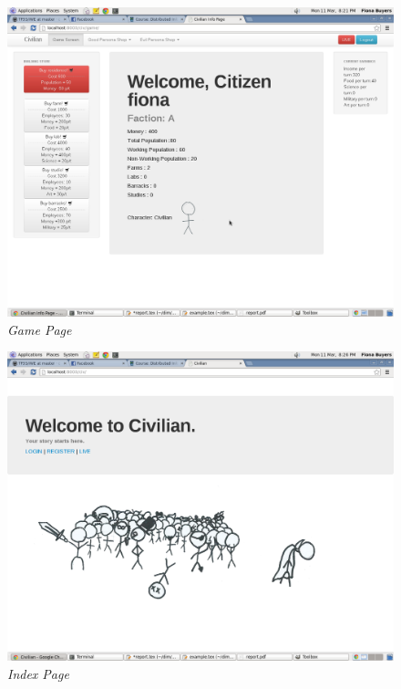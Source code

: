 \documentclass{sig-alt-release2}
\begin{document}
\begin{figure}[!htbp]
  \caption{\textit{Game Page}}
  \begin{center}
		\includegraphics[scale=0.15]{img/gamescreen.png}
  \end{center}
\end{figure}

\begin{figure}[!htbp]
  \caption{\textit{Index Page}}
  \begin{center}
		\includegraphics[scale=0.15]{img/index2.png}
  \end{center}
\end{figure}
\end{document}
